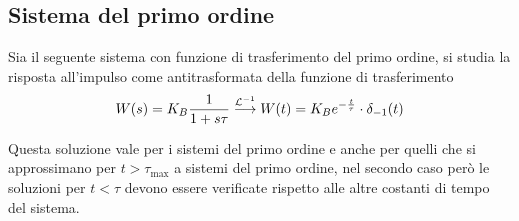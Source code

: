 \subsection{Sistema del primo ordine}
Sia il seguente sistema con funzione di trasferimento del primo ordine, si
studia la risposta all'impulso come antitrasformata della funzione di
trasferimento
$$
W(s) = K_B \frac{1}{1+s\tau} \stackrel{\mathcal{L}^{-1}}{\longrightarrow} W(t) = K_B
e^{-\frac{t}{\tau}}\cdot \delta_{-1}(t)
$$
\begin{figure}[h]
 \centering
\end{figure}
Questa soluzione vale per i sistemi del primo ordine e anche per quelli che si
approssimano per $t>\tau_{\text{max}}$ a sistemi del primo ordine, nel secondo
caso però le soluzioni per $t<\tau$ devono essere verificate rispetto alle
altre costanti di tempo del sistema.

